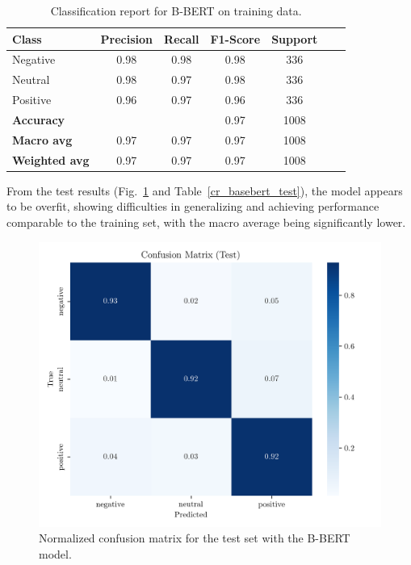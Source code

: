 \documentclass[conference]{IEEEtran}
\begin{document}
\begin{table}[H]
\centering
\caption{Classification report for B-BERT on training data.}
\label{cr_basebert_train}
\begin{tabular}{lcccccc}
\toprule
\textbf{Class} & \textbf{Precision} & \textbf{Recall} & \textbf{F1-Score} & \textbf{Support} \\
\midrule
Negative & 0.98 & 0.98 & 0.98 & 336 \\
Neutral & 0.98 & 0.97 & 0.98 & 336 \\
Positive & 0.96 & 0.97 & 0.96 & 336 \\
\midrule
\textbf{Accuracy} &  &  & 0.97 & 1008 \\
\textbf{Macro avg} & 0.97 & 0.97 & 0.97 & 1008 \\
\textbf{Weighted avg} & 0.97 & 0.97 & 0.97 & 1008 \\
\bottomrule
\end{tabular}
\end{table}

From the test results (Fig.~\ref{fig:base_bert_confusion_matrix_Test} and Table~\ref{cr_basebert_test}), the model appears to be overfit, showing difficulties in generalizing and achieving performance comparable to the training set, with the macro average being significantly lower.

\begin{figure}[H]
    \centering
    \includegraphics[width=1\linewidth]{assets/base_bert_confusion_matrix_Test.png}
    \caption{Normalized confusion matrix for the test set with the B-BERT model.}
    \label{fig:base_bert_confusion_matrix_Test}
\end{figure}
\end{document}
